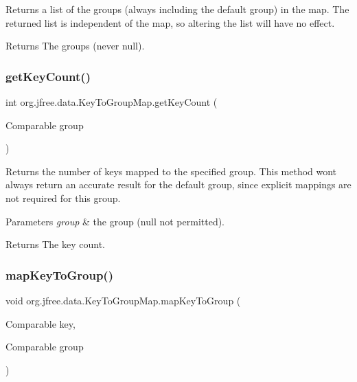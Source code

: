 Returns a list of the groups (always including the default group) in the map. The returned list is independent of the map, so altering the list will have no effect.

\begin{DoxyReturn}{Returns}
The groups (never {\ttfamily null}). 
\end{DoxyReturn}
\mbox{\label{classorg_1_1jfree_1_1data_1_1_key_to_group_map_affb83a01616bc838d5e7e04d44eebb20}} 
\subsubsection{\texorpdfstring{get\+Key\+Count()}{getKeyCount()}}
{\footnotesize\ttfamily int org.\+jfree.\+data.\+Key\+To\+Group\+Map.\+get\+Key\+Count (\begin{DoxyParamCaption}\item[{Comparable}]{group }\end{DoxyParamCaption})}

Returns the number of keys mapped to the specified group. This method won\textquotesingle{}t always return an accurate result for the default group, since explicit mappings are not required for this group.


\begin{DoxyParams}{Parameters}
{\em group} & the group ({\ttfamily null} not permitted).\\
\hline
\end{DoxyParams}
\begin{DoxyReturn}{Returns}
The key count. 
\end{DoxyReturn}
\mbox{\label{classorg_1_1jfree_1_1data_1_1_key_to_group_map_a61a66692879a5ade8630026690152797}} 
\subsubsection{\texorpdfstring{map\+Key\+To\+Group()}{mapKeyToGroup()}}
{\footnotesize\ttfamily void org.\+jfree.\+data.\+Key\+To\+Group\+Map.\+map\+Key\+To\+Group (\begin{DoxyParamCaption}\item[{Comparable}]{key,  }\item[{Comparable}]{group }\end{DoxyParamCaption})}


